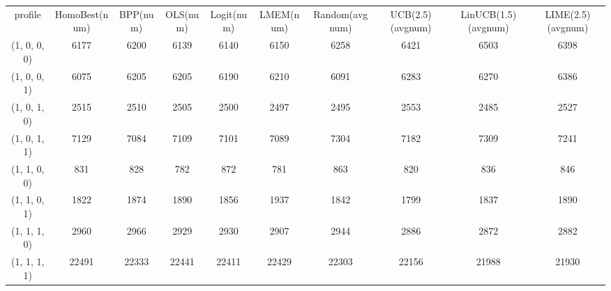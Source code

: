 \begin{tabular}{cccccccccc}
profile & HomoBest(num) & BPP(num) & OLS(num) & Logit(num) & LMEM(num) & Random(avgnum) & UCB(2.5)(avgnum) & LinUCB(1.5)(avgnum) & LIME(2.5)(avgnum)\\
(1, 0, 0, 0) & 6177 & 6200 & 6139 & 6140 & 6150 & 6258 & 6421 & 6503 & 6398\\
(1, 0, 0, 1) & 6075 & 6205 & 6205 & 6190 & 6210 & 6091 & 6283 & 6270 & 6386\\
(1, 0, 1, 0) & 2515 & 2510 & 2505 & 2500 & 2497 & 2495 & 2553 & 2485 & 2527\\
(1, 0, 1, 1) & 7129 & 7084 & 7109 & 7101 & 7089 & 7304 & 7182 & 7309 & 7241\\
(1, 1, 0, 0) & 831 & 828 & 782 & 872 & 781 & 863 & 820 & 836 & 846\\
(1, 1, 0, 1) & 1822 & 1874 & 1890 & 1856 & 1937 & 1842 & 1799 & 1837 & 1890\\
(1, 1, 1, 0) & 2960 & 2966 & 2929 & 2930 & 2907 & 2944 & 2886 & 2872 & 2882\\
(1, 1, 1, 1) & 22491 & 22333 & 22441 & 22411 & 22429 & 22303 & 22156 & 21988 & 21930\\
\end{tabular}
